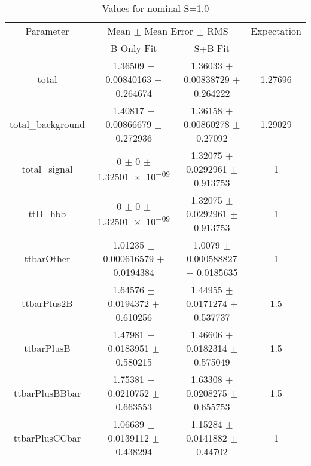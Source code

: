 \begin{table}
\centering
\caption{Values for nominal S=1.0}
\begin{tabular}{cccc}
\toprule
Parameter & \multicolumn{2}{c}{Mean $\pm$ Mean Error $\pm$ RMS} & Expectation\\
 & B-Only Fit & S+B Fit & \\
\midrule
total & \num{1.36509} $\pm$ \num{0.00840163} $\pm$ \num{0.264674} & \num{1.36033} $\pm$ \num{0.00838729} $\pm$ \num{0.264222} & \num{1.27696}\\
total\_background & \num{1.40817} $\pm$ \num{0.00866679} $\pm$ \num{0.272936} & \num{1.36158} $\pm$ \num{0.00860278} $\pm$ \num{0.27092} & \num{1.29029}\\
total\_signal & \num{0} $\pm$ \num{0} $\pm$ \num{1.32501e-09} & \num{1.32075} $\pm$ \num{0.0292961} $\pm$ \num{0.913753} & \num{1}\\
ttH\_hbb & \num{0} $\pm$ \num{0} $\pm$ \num{1.32501e-09} & \num{1.32075} $\pm$ \num{0.0292961} $\pm$ \num{0.913753} & \num{1}\\
ttbarOther & \num{1.01235} $\pm$ \num{0.000616579} $\pm$ \num{0.0194384} & \num{1.0079} $\pm$ \num{0.000588827} $\pm$ \num{0.0185635} & \num{1}\\
ttbarPlus2B & \num{1.64576} $\pm$ \num{0.0194372} $\pm$ \num{0.610256} & \num{1.44955} $\pm$ \num{0.0171274} $\pm$ \num{0.537737} & \num{1.5}\\
ttbarPlusB & \num{1.47981} $\pm$ \num{0.0183951} $\pm$ \num{0.580215} & \num{1.46606} $\pm$ \num{0.0182314} $\pm$ \num{0.575049} & \num{1.5}\\
ttbarPlusBBbar & \num{1.75381} $\pm$ \num{0.0210752} $\pm$ \num{0.663553} & \num{1.63308} $\pm$ \num{0.0208275} $\pm$ \num{0.655753} & \num{1.5}\\
ttbarPlusCCbar & \num{1.06639} $\pm$ \num{0.0139112} $\pm$ \num{0.438294} & \num{1.15284} $\pm$ \num{0.0141882} $\pm$ \num{0.44702} & \num{1}\\
\bottomrule
\end{tabular}
\end{table}